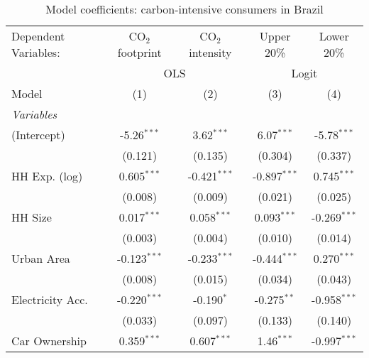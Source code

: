 
\begin{table}[htbp!]
   \centering
   \small
   \begin{adjustbox}{width = 1\textwidth, max height = 0.95\textheight, center}
      \begin{threeparttable}[b]
         \caption{\label{tab:Logit_1_BRA} Model coefficients: carbon-intensive consumers in Brazil}
         \begin{tabular}{lcccc}
            \tabularnewline \midrule \midrule
            Dependent Variables: & CO$_{2}$ footprint & CO$_{2}$ intensity & Upper 20\%     & Lower 20\%\\   
             & \multicolumn{2}{c}{OLS} & \multicolumn{2}{c}{Logit} \\ 
            Model                & (1)                & (2)                & (3)            & (4)\\  
            \midrule
            \emph{Variables}\\
            (Intercept)          & -5.26$^{***}$      & 3.62$^{***}$       & 6.07$^{***}$   & -5.78$^{***}$\\   
                                 & (0.121)            & (0.135)            & (0.304)        & (0.337)\\   
            HH Exp. (log)        & 0.605$^{***}$      & -0.421$^{***}$     & -0.897$^{***}$ & 0.745$^{***}$\\   
                                 & (0.008)            & (0.009)            & (0.021)        & (0.025)\\   
            HH Size              & 0.017$^{***}$      & 0.058$^{***}$      & 0.093$^{***}$  & -0.269$^{***}$\\   
                                 & (0.003)            & (0.004)            & (0.010)        & (0.014)\\   
            Urban Area           & -0.123$^{***}$     & -0.233$^{***}$     & -0.444$^{***}$ & 0.270$^{***}$\\   
                                 & (0.008)            & (0.015)            & (0.034)        & (0.043)\\   
            Electricity Acc.     & -0.220$^{***}$     & -0.190$^{*}$       & -0.275$^{**}$  & -0.958$^{***}$\\   
                                 & (0.033)            & (0.097)            & (0.133)        & (0.140)\\   
            Car Ownership        & 0.359$^{***}$      & 0.607$^{***}$      & 1.46$^{***}$   & -0.997$^{***}$\\   

\end{tabular}
\end{threeparttable}
\end{adjustbox}
\end{table}
